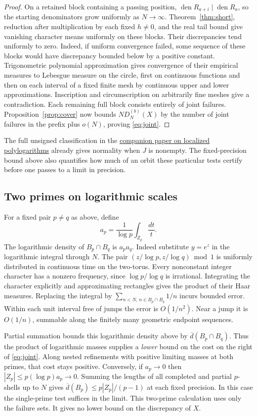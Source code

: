 \documentclass[11pt]{article}
\DeclareMathOperator{\den}{den}
\begin{document}
\begin{proof}
On a retained block containing a passing position, \(\den R_{a+i}\mid\den R_a\), so the starting denominators grow uniformly as \(N\to\infty\). Theorem~\ref{thm:short}, reduction after multiplication by each fixed \(h\ne0\), and the real tail bound give vanishing character means uniformly on these blocks. Their discrepancies tend uniformly to zero. Indeed, if uniform convergence failed, some sequence of these blocks would have discrepancy bounded below by a positive constant. Trigonometric polynomial approximation gives convergence of their empirical measures to Lebesgue measure on the circle, first on continuous functions and then on each interval of a fixed finite mesh by continuous upper and lower approximations. Inscription and circumscription on arbitrarily fine meshes give a contradiction. Each remaining full block consists entirely of joint failures. Proposition~\ref{prop:cover} now bounds \(N D_N^{(b)}(X)\) by the number of joint failures in the prefix plus \(o(N)\), proving \eqref{eq:joint}.
\end{proof}

The full unsigned classification in the \href{https://github.com/eldernos/MathematicsResearch/blob/3545d5f3072502e41d633d8900f20ad96c36be64/papers/02-localized-normality/paper.pdf}{companion paper on localized polylogarithms} already gives normality when \(J\) is nonempty. The fixed-precision bound above also quantifies how much of an orbit these particular tests certify before one passes to a limit in precision.

\subsection*{Two primes on logarithmic scales}
For a fixed pair \(p\ne q\) as above, define
\[
 a_p=\frac1{\log p}\int_{Z_p}\frac{dt}{t}.
\]
The logarithmic density of \(B_p\cap B_q\) is \(a_pa_q\). Indeed substitute \(y=e^z\) in the logarithmic integral through \(N\). The pair \((z/\log p,z/\log q)\bmod1\) is uniformly distributed in continuous time on the two-torus. Every nonconstant integer character has a nonzero frequency, since \(\log p/\log q\) is irrational. Integrating the character explicitly and approximating rectangles gives the product of their Haar measures. Replacing the integral by \(\sum_{n<N,\,n\in B_p\cap B_q}1/n\) incurs bounded error. Within each unit interval free of jumps the error is \(O(1/n^2)\). Near a jump it is \(O(1/n)\), summable along the finitely many geometric endpoint sequences.

Partial summation bounds this logarithmic density above by \(\overline d(B_p\cap B_q)\). Thus the product of logarithmic masses supplies a \emph{lower} bound on the cost on the right of \eqref{eq:joint}. Along nested refinements with positive limiting masses at both primes, that cost stays positive. Conversely, if \(a_p\to0\) then \(|Z_p|\le p(\log p)a_p\to0\). Summing the lengths of all completed and partial \(p\)-shells up to \(N\) gives \(\overline d(B_p)\le p|Z_p|/(p-1)\) at each fixed precision. In this case the single-prime test suffices in the limit. This two-prime calculation uses only the failure sets. It gives no lower bound on the discrepancy of \(X\).
\end{document}
